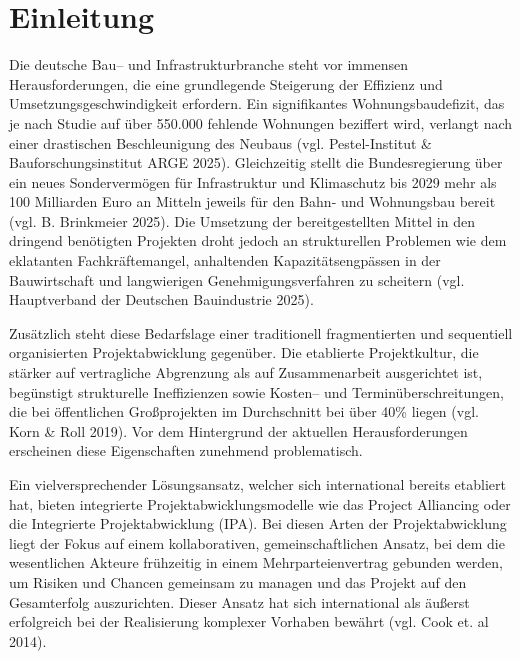 \chapter{Einleitung}
\label{ch:einleitung}

Die deutsche Bau-- und Infrastrukturbranche steht vor immensen Herausforderungen, die  eine grundlegende Steigerung der Effizienz und Umsetzungsgeschwindigkeit erfordern.  Ein signifikantes Wohnungsbaudefizit, das je nach Studie auf über 550.000 fehlende  Wohnungen beziffert wird, verlangt nach einer drastischen Beschleunigung des Neubaus (vgl. Pestel-Institut \& Bauforschungsinstitut ARGE 2025). Gleichzeitig stellt die  Bundesregierung über ein neues Sondervermögen für Infrastruktur und Klimaschutz bis  2029 mehr als 100 Milliarden Euro an Mitteln jeweils für den Bahn- und Wohnungsbau  bereit (vgl. B. Brinkmeier 2025). Die Umsetzung der bereitgestellten Mittel in den dringend  benötigten Projekten droht jedoch an strukturellen Problemen wie dem eklatanten  Fachkräftemangel, anhaltenden Kapazitätsengpässen in der Bauwirtschaft und  langwierigen Genehmigungsverfahren zu scheitern (vgl. Hauptverband der Deutschen  Bauindustrie 2025).

Zusätzlich steht diese Bedarfslage einer traditionell fragmentierten und sequentiell  organisierten Projektabwicklung gegenüber. Die etablierte Projektkultur, die stärker auf  vertragliche Abgrenzung als auf Zusammenarbeit ausgerichtet ist, begünstigt strukturelle  Ineffizienzen sowie Kosten-- und Terminüberschreitungen, die bei öffentlichen  Großprojekten im Durchschnitt bei über 40\% liegen (vgl. Korn \& Roll 2019). Vor dem  Hintergrund der aktuellen Herausforderungen erscheinen diese Eigenschaften  zunehmend problematisch.

Ein vielversprechender Lösungsansatz, welcher sich international bereits etabliert hat,  bieten integrierte Projektabwicklungsmodelle wie das Project Alliancing oder die  Integrierte Projektabwicklung (IPA). Bei diesen Arten der Projektabwicklung liegt der  Fokus auf einem kollaborativen, gemeinschaftlichen Ansatz, bei dem die wesentlichen  Akteure frühzeitig in einem Mehrparteienvertrag gebunden werden, um Risiken und  Chancen gemeinsam zu managen und das Projekt auf den Gesamterfolg auszurichten.  Dieser Ansatz hat sich international als äußerst erfolgreich bei der Realisierung  komplexer Vorhaben bewährt (vgl. Cook et. al 2014).


